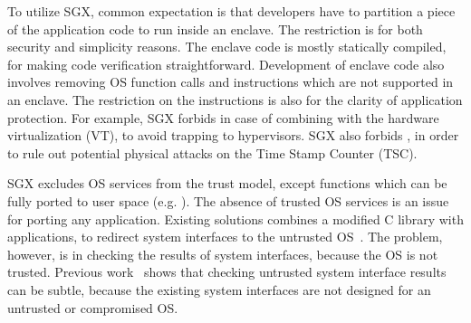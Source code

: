 
To utilize SGX, common expectation is that developers have to partition a piece of the application code to run inside an enclave.
The restriction is for both security and simplicity reasons.
The enclave code is mostly statically compiled, for making code verification straightforward.
Development of enclave code also involves removing OS function calls and instructions which are not supported in an enclave.
The restriction on the instructions is also for the clarity of application protection.
For example,
SGX forbids  in case of combining with the hardware virtualization (VT),
to avoid trapping to hypervisors.
SGX also forbids , in order to rule out potential physical attacks on the Time Stamp Counter (TSC). 


SGX excludes OS services from the trust model, except functions which can be fully ported to user space (e.g. ).
The absence of trusted OS services is an issue for porting any application.
Existing solutions combines a modified C library with applications, to redirect system interfaces
to the untrusted OS~\cite{osdi16scone,shinde17panoply}.
The problem, however, is in checking the results of system interfaces, because the OS is not trusted. %
Previous work~\cite{checkoway13iago} shows that
checking untrusted system interface results can be subtle, because the existing system interfaces are not designed for an untrusted or compromised OS.


